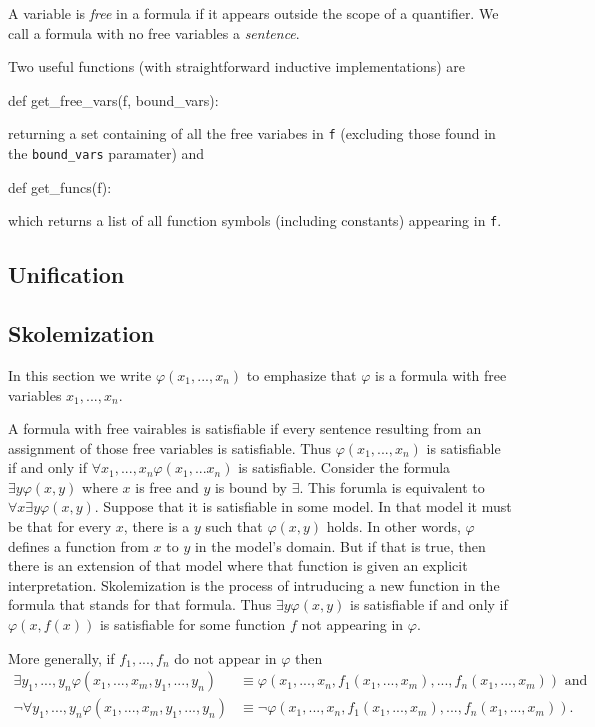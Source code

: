 \documentclass[a4paper,notitlepage]{scrartcl}
\let\phi\varphi
\begin{document}
A variable is \emph{free} in a formula if it appears outside the scope
   of a quantifier.
We call a formula with no free variables a \emph{sentence}.

Two useful functions (with straightforward inductive implementations) are
\begin{code}
def get_free_vars(f, bound_vars):
\end{code}
returning a set containing of all the free variabes in \texttt{f} (excluding those
   found in the \texttt{bound\_vars} paramater) and
\begin{code}
def get_funcs(f):
\end{code}
which returns a list of all function symbols (including constants) appearing
   in \texttt{f}.

\subsection{Unification}

\subsection{Skolemization}
In this section we write $\phi(x_1,...,x_n)$ to emphasize that $\phi$ is
   a formula with free variables $x_1,...,x_n$.

A formula with free vairables is satisfiable if every sentence resulting
   from an assignment of those free variables is satisfiable.
Thus $\phi(x_1,...,x_n)$ is satisfiable if and only if $\forall x_1,...,
   x_n\phi(x_1,...x_n)$ is satisfiable.
Consider the formula $\exists y \phi(x, y)$ where $x$ is free and $y$
   is bound by $\exists$.
This forumla is equivalent to $\forall x\exists y\phi(x, y)$.
Suppose that it is satisfiable in some model.
In that model it must be that for every $x$, there is a $y$ such 
   that $\phi(x,y)$ holds.
In other words, $\phi$ defines a function from $x$ to $y$ in the model's
   domain.
But if that is true, then there is an extension of that model where
   that function is given an explicit interpretation.
Skolemization is the process of intruducing a new function in the formula
   that stands for that formula.
Thus $\exists y\phi(x, y)$ is satisfiable if and only
   if $\phi(x, f(x))$ is satisfiable for some function $f$ not appearing
   in $\phi$.

More generally, if $f_1,...,f_n$ do not appear in $\phi$ then
\begin{align}
\exists y_1,...,y_n\phi(x_1,...,x_m, y_1,...,y_n)
   &\equiv \phi(x_1,...,x_n, f_1(x_1,...,x_m),...,f_n(x_1,...,x_m))\text{ and}\\
\lnot\forall y_1,...,y_n\phi(x_1,...,x_m, y_1,...,y_n)
   &\equiv \lnot \phi(x_1,...,x_n, f_1(x_1,...,x_m),...,f_n(x_1,...,x_m)).
\end{align}
\end{document}
